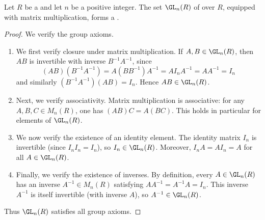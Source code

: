\begin{proposition} \label{proposition:general_linear_group_over_a_ring_is_indeed_a_group}
    Let $R$ be a  and let $n$ be a positive integer. The set $\GL_n(R)$ of  over $R$, equipped with matrix multiplication, forms a .
\end{proposition}
\begin{proof}
    We verify the group axioms.

    \begin{enumerate}
        \item We first verify closure under matrix multiplication. If $A, B \in \GL_n(R)$, then $AB$ is invertible with inverse $B^{-1} A^{-1}$, since
        $$(AB)(B^{-1} A^{-1}) = A (B B^{-1}) A^{-1} = A I_n A^{-1} = A A^{-1} = I_n$$
        and similarly $(B^{-1} A^{-1})(AB) = I_n$. Hence $AB \in \GL_n(R)$.

        \item Next, we verify associativity. Matrix multiplication is associative: for any $A, B, C \in M_n(R)$, one has $(AB)C = A(BC)$. This holds in particular for elements of $\GL_n(R)$.

        \item We now verify the existence of an identity element. The identity matrix $I_n$ is invertible (since $I_n I_n = I_n$), so $I_n \in \GL_n(R)$. Moreover, $I_n A = A I_n = A$ for all $A \in \GL_n(R)$.

        \item Finally, we verify the existence of inverses. By definition, every $A \in \GL_n(R)$ has an inverse $A^{-1} \in M_n(R)$ satisfying $A A^{-1} = A^{-1} A = I_n$. This inverse $A^{-1}$ is itself invertible (with inverse $A$), so $A^{-1} \in \GL_n(R)$.
    \end{enumerate}

    Thus $\GL_n(R)$ satisfies all group axioms.
\end{proof}